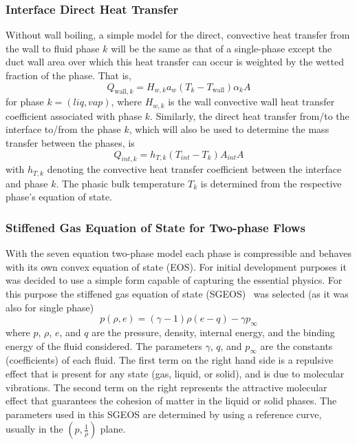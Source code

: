 \subsubsection{Interface Direct Heat Transfer}
Without wall boiling, a simple model for the direct, convective heat transfer
from the wall to fluid phase $k$ will be the same as that of a single-phase
except the duct wall area over which this heat transfer can occur is weighted
by the wetted fraction of the phase.  That is,
\begin{equation}
  Q_{ \text{wall}, k } = H_{w,k} a_w \left(T_k  - T_{ \text{wall} } \right) \alpha_k A
\end{equation}
for phase $k=(liq, vap)$, where $H_{w,k}$ is the wall convective wall heat transfer
coefficient associated with phase $k$. Similarly, the direct heat
transfer from/to the interface to/from the phase $k$, which will also
be used to determine the mass transfer between the phases, is
\begin{equation}
  Q_{int,  k} = h_{T,  k}  \left( T_{int} - T_k \right)  A_{int}  A
\end{equation}
with $h_{T,  k}$ denoting the convective heat transfer coefficient
between the interface and phase $k$. The phasic bulk
temperature $T_k$ is determined from the respective phase's equation of
state.
\subsubsection{Stiffened Gas Equation of State for Two-phase Flows} \label{sec:SGEOS}
With the seven equation two-phase model each phase is compressible and
behaves with its own convex equation of state (EOS).  For initial
development purposes it was decided to use a simple form capable of
capturing the essential physics.  For this purpose the stiffened
gas equation of state (SGEOS)~\cite{SGEOS} was selected (as
it was also for single phase)
\begin{equation}
  \label{E-R:96}
  p(\rho,e) = (\gamma -1) \rho (e - q) - \gamma p_{\infty}
\end{equation}
where $p$, $\rho$, $e$, and $q$ are the pressure, density,
internal energy, and the binding energy of the fluid considered.  The
parameters $\gamma$, $q$, and $p_{\infty}$ are the constants
(coefficients) of each fluid.  The first term on the right hand side
is a repulsive effect that is present for any state (gas, liquid, or
solid), and is due to molecular vibrations.  The second term on the
right represents the attractive molecular effect that guarantees the
cohesion of matter in the liquid or solid phases.  The parameters used
in this SGEOS are determined by using a reference curve, usually in
the $\left(p, \frac{1}{\rho}\right)$ plane.

